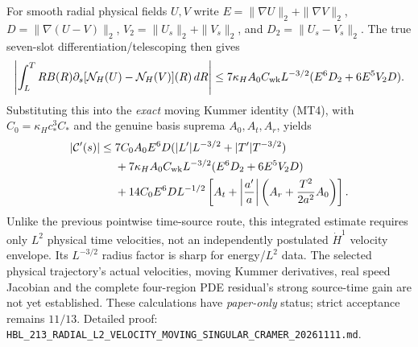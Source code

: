 For smooth radial physical fields \(U,V\) write
\(E=\|\nabla U\|_2+\|\nabla V\|_2\),
\(D=\|\nabla(U-V)\|_2\),
\(V_2=\|U_s\|_2+\|V_s\|_2\), and
\(D_2=\|U_s-V_s\|_2\).
The true seven-slot differentiation/telescoping then gives
\[
 \left|\int_L^T RB(R)\partial_s
  [\mathcal N_H(U)-\mathcal N_H(V)](R)\,dR\right|
 \le7\kappa_H A_0C_{\rm wk}L^{-3/2}
      (E^6D_2+6E^5V_2D).
\]
Substituting this into the \emph{exact} moving Kummer identity (MT4),
with \(C_0=\kappa_Hc_*^3C_*\) and the genuine basis suprema
\(A_0,A_t,A_r\), yields
\[
\begin{aligned}
|\mathcal C'(s)|\le{}&
 7C_0A_0E^6D
  (|L'|L^{-3/2}+|T'|T^{-3/2})\\
&+7\kappa_HA_0C_{\rm wk}L^{-3/2}
  (E^6D_2+6E^5V_2D)\\
&+14C_0E^6DL^{-1/2}
 \left[A_t+\left|\frac{a'}a\right|
 \left(A_r+\frac{T^2}{2a^2}A_0\right)\right].
\end{aligned}
\]
Unlike the previous pointwise time-source route, this integrated
estimate requires only \(L^2\) physical time velocities, not an
independently postulated \(\dot H^1\) velocity envelope.
Its \(L^{-3/2}\) radius factor is sharp for energy/\(L^2\) data.
The selected physical trajectory's actual velocities, moving
Kummer derivatives, real speed Jacobian and the complete four-region
PDE residual's strong source-time gain are not yet established.
These calculations have \emph{paper-only} status; strict acceptance
remains \(11/13\). Detailed proof: \texttt{HBL\_213\_RADIAL\_L2\_VELOCITY\_MOVING\_SINGULAR\_CRAMER\_20261111.md}.
